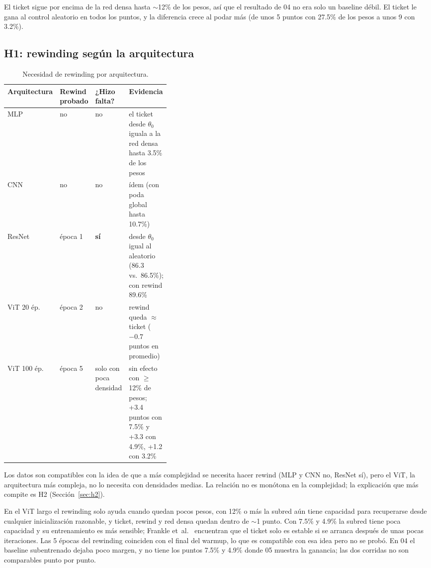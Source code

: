 \documentclass[11pt]{article}
\begin{document}
El ticket sigue por encima de la red densa hasta $\sim$12\% de los pesos, así que el resultado de 04 no era solo un baseline débil. El ticket le gana al control aleatorio en todos los puntos, y la diferencia crece al podar más (de unos 5 puntos con 27.5\% de los pesos a unos 9 con 3.2\%).

\subsection{H1: rewinding según la arquitectura}
\begin{table}[H]
\centering\small
\begin{tabular}{@{}lll>{\raggedright\arraybackslash}p{0.38\linewidth}@{}}
\toprule
Arquitectura & Rewind probado & ¿Hizo falta? & Evidencia \\
\midrule
MLP & no & no & el ticket desde $\theta_0$ iguala a la red densa hasta 3.5\% de los pesos \\
CNN & no & no & ídem (con poda global hasta 10.7\%) \\
ResNet & época 1 & \textbf{sí} & desde $\theta_0$ igual al aleatorio (86.3 vs.\ 86.5\%); con rewind 89.6\% \\
ViT 20 ép. & época 2 & no & rewind queda $\approx$ ticket ($-0.7$ puntos en promedio) \\
ViT 100 ép. & época 5 & solo con poca densidad & sin efecto con $\ge$12\% de pesos; +3.4 puntos con 7.5\% y +3.3 con 4.9\%, +1.2 con 3.2\% \\
\bottomrule
\end{tabular}
\caption{Necesidad de rewinding por arquitectura.}
\end{table}

Los datos son compatibles con la idea de que a más complejidad se necesita hacer rewind (MLP y CNN no, ResNet sí), pero el ViT, la arquitectura más compleja, no lo necesita con densidades medias. La relación no es monótona en la complejidad; la explicación que más compite es H2 (Sección~\ref{sec:h2}).

En el ViT largo el rewinding solo ayuda cuando quedan pocos pesos, con 12\% o más la subred aún tiene capacidad para recuperarse desde cualquier inicialización razonable, y ticket, rewind y red densa quedan dentro de $\sim$1 punto. Con 7.5\% y 4.9\% la subred tiene poca capacidad y su entrenamiento es más sensible; Frankle et~al.\ \cite{frankle2019stabilizing} encuentran que el ticket solo es estable si se arranca después de unas pocas iteraciones. Las 5 épocas del rewinding coinciden con el final del warmup, lo que es compatible con esa idea pero no se probó. En 04 el baseline subentrenado dejaba poco margen, y no tiene los puntos 7.5\% y 4.9\% donde 05 muestra la ganancia; las dos corridas no son comparables punto por punto.
\end{document}
